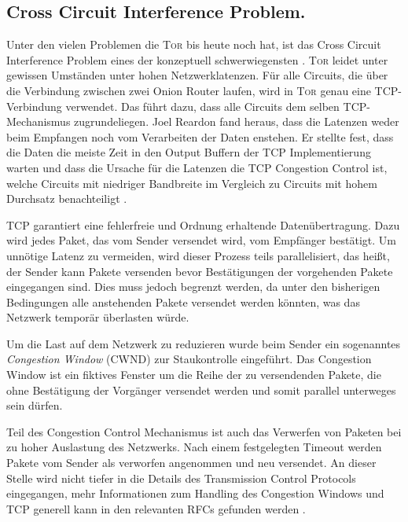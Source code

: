 \documentclass[fleqn,envcountsame,runningheads,10pt,a4paper]{llncs}
\begin{document}
\subsection{Cross Circuit Interference Problem.}
\label{sec:crosscircuitinterference} 

Unter den vielen Problemen die \textsc{Tor} bis heute noch hat, ist das Cross Circuit Interference Problem eines der konzeptuell schwerwiegensten \cite{tor_improvements}.
\textsc{Tor} leidet unter gewissen Umständen unter hohen Netzwerklatenzen.
Für alle Circuits, die über die Verbindung zwischen zwei Onion Router laufen, wird in \textsc{Tor} genau eine TCP-Verbindung verwendet.
Das führt dazu, dass alle Circuits dem selben TCP-Mechanismus zugrundeliegen.
Joel Reardon fand heraus, dass die Latenzen weder beim Empfangen noch vom Verarbeiten der Daten enstehen.
Er stellte fest, dass die Daten die meiste Zeit in den Output Buffern der TCP Implementierung warten und dass die Ursache für die Latenzen die TCP Congestion Control ist, welche Circuits mit niedriger Bandbreite im Vergleich zu Circuits mit hohem Durchsatz benachteiligt \cite{tcp-over-dtls-thesis,tcp-over-dtls}.

TCP garantiert eine fehlerfreie und Ordnung erhaltende Datenübertragung. Dazu wird jedes Paket, das vom Sender versendet wird, vom Empfänger bestätigt.
Um unnötige Latenz zu vermeiden, wird dieser Prozess teils parallelisiert, das heißt, der Sender kann Pakete versenden bevor Bestätigungen der vorgehenden Pakete eingegangen sind. Dies muss jedoch begrenzt werden, da unter den bisherigen Bedingungen alle anstehenden Pakete versendet werden könnten, was das Netzwerk temporär überlasten würde.

Um die Last auf dem Netzwerk zu reduzieren wurde beim Sender ein sogenanntes \textit{Congestion Window} (CWND) zur Staukontrolle eingeführt. Das Congestion Window ist ein fiktives Fenster um die Reihe der zu versendenden Pakete, die ohne Bestätigung der Vorgänger versendet werden und somit parallel unterweges sein dürfen.

Teil des Congestion Control Mechanismus ist auch das Verwerfen von Paketen bei zu hoher Auslastung des Netzwerks. Nach einem festgelegten Timeout werden Pakete vom Sender als verworfen angenommen und neu versendet. An dieser Stelle wird nicht tiefer in die Details des Transmission Control Protocols eingegangen, mehr Informationen zum Handling des Congestion Windows und TCP generell kann in den relevanten RFCs gefunden werden \cite{rfc:tcp, rfc:tcpcc}.
\end{document}
